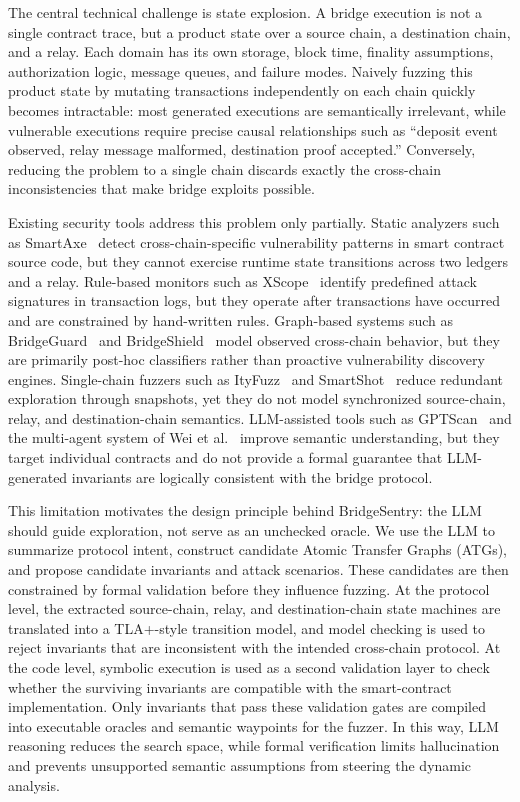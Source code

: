 \documentclass[journal]{IEEEtran}
\begin{document}
The central technical challenge is state explosion. A bridge execution is not a single contract trace, but a product state over a source chain, a destination chain, and a relay. Each domain has its own storage, block time, finality assumptions, authorization logic, message queues, and failure modes. Naively fuzzing this product state by mutating transactions independently on each chain quickly becomes intractable: most generated executions are semantically irrelevant, while vulnerable executions require precise causal relationships such as ``deposit event observed, relay message malformed, destination proof accepted.'' Conversely, reducing the problem to a single chain discards exactly the cross-chain inconsistencies that make bridge exploits possible.

Existing security tools address this problem only partially. Static analyzers such as SmartAxe~\cite{liao2024smartaxe} detect cross-chain-specific vulnerability patterns in smart contract source code, but they cannot exercise runtime state transitions across two ledgers and a relay. Rule-based monitors such as XScope~\cite{zhang2022xscope} identify predefined attack signatures in transaction logs, but they operate after transactions have occurred and are constrained by hand-written rules. Graph-based systems such as BridgeGuard~\cite{wu2025safeguarding} and BridgeShield~\cite{lin2025bridgeshield} model observed cross-chain behavior, but they are primarily post-hoc classifiers rather than proactive vulnerability discovery engines. Single-chain fuzzers such as ItyFuzz~\cite{shou2023ityfuzz} and SmartShot~\cite{liang2025smartshot} reduce redundant exploration through snapshots, yet they do not model synchronized source-chain, relay, and destination-chain semantics. LLM-assisted tools such as GPTScan~\cite{sun2024gptscan} and the multi-agent system of Wei et al.~\cite{wei2025llm} improve semantic understanding, but they target individual contracts and do not provide a formal guarantee that LLM-generated invariants are logically consistent with the bridge protocol.

This limitation motivates the design principle behind BridgeSentry: the LLM should guide exploration, not serve as an unchecked oracle. We use the LLM to summarize protocol intent, construct candidate Atomic Transfer Graphs (ATGs), and propose candidate invariants and attack scenarios. These candidates are then constrained by formal validation before they influence fuzzing. At the protocol level, the extracted source-chain, relay, and destination-chain state machines are translated into a TLA+-style transition model, and model checking is used to reject invariants that are inconsistent with the intended cross-chain protocol. At the code level, symbolic execution is used as a second validation layer to check whether the surviving invariants are compatible with the smart-contract implementation. Only invariants that pass these validation gates are compiled into executable oracles and semantic waypoints for the fuzzer. In this way, LLM reasoning reduces the search space, while formal verification limits hallucination and prevents unsupported semantic assumptions from steering the dynamic analysis.
\end{document}
